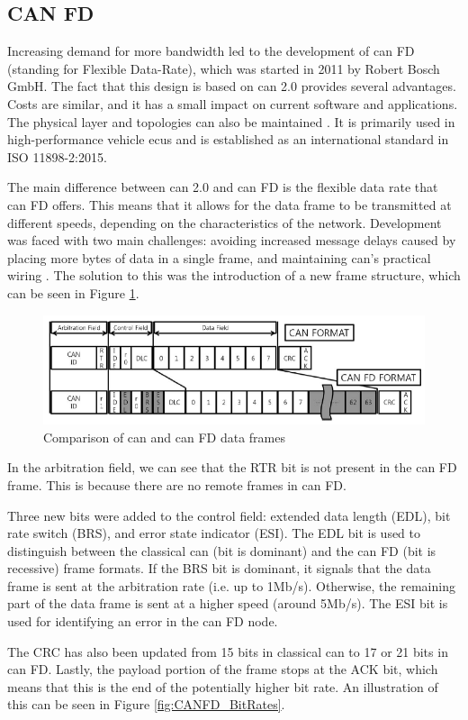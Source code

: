 \subsection{CAN FD}

Increasing demand for more bandwidth led to the development of \gls{can} FD (standing for Flexible Data-Rate), which was started in 2011 by Robert Bosch GmbH. The fact that this design is based on \gls{can} 2.0 provides several advantages. Costs are similar, and it has a small impact on current software and applications. The physical layer and topologies can also be maintained \citep{Woo2016}. It is primarily used in high-performance vehicle \glspl{ecu} and is established as an international standard in ISO 11898-2:2015.\par
The main difference between \gls{can} 2.0 and \gls{can} FD is the flexible data rate that \gls{can} FD offers. This means that it allows for the data frame to be transmitted at different speeds, depending on the characteristics of the network. Development was faced with two main challenges: avoiding increased message delays caused by placing more bytes of data in a single frame, and maintaining \gls{can}'s practical wiring \citep{CANFD}. The solution to this was the introduction of a new frame structure, which can be seen in Figure \ref{fig:CANFD_Frame}.

\begin{figure}
    \centering
    \includegraphics[width = \textwidth]{img/parts/introduction/CAN FD.png}
    \caption{Comparison of \gls{can} and \gls{can} FD data frames \citep{Woo2016}}
    \label{fig:CANFD_Frame}
\end{figure}

In the arbitration field, we can see that the RTR bit is not present in the \gls{can} FD frame. This is because there are no remote frames in \gls{can} FD.\par
Three new bits were added to the control field: extended data length (EDL), bit rate switch (BRS), and error state indicator (ESI). The EDL bit is used to distinguish between the classical \gls{can} (bit is dominant) and the \gls{can} FD (bit is recessive) frame formats. If the BRS bit is dominant, it signals that the data frame is sent at the arbitration rate (i.e. up to 1Mb/s). Otherwise, the remaining part of the data frame is sent at a higher speed (around 5Mb/s). The ESI bit is used for identifying an error in the \gls{can} FD node.\par
The CRC has also been updated from 15 bits in classical \gls{can} to 17 or 21 bits in \gls{can} FD. Lastly, the payload portion of the frame stops at the ACK bit, which means that this is the end of the potentially higher bit rate. An illustration of this can be seen in Figure \ref{fig:CANFD_BitRates}.


